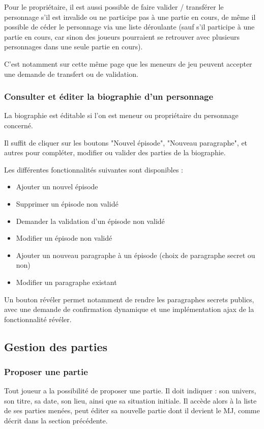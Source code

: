 \documentclass[a4paper, 11pt, titlepage]{article}
\begin{document}
Pour le propriétaire, il est aussi possible de faire valider / transférer le personnage s'il est invalide ou ne participe pas à une partie en cours, de même il possible de céder le personnage via une liste déroulante (sauf s'il participe à une partie en cours, car sinon des joueurs pourraient se retrouver avec plusieurs personnages dans une seule partie en cours).

C'est notamment sur cette même page que les meneurs de jeu peuvent accepter une demande de transfert ou de validation.


\subsubsection {Consulter et éditer la biographie d'un personnage}

La biographie est éditable si l'on est meneur ou propriétaire du personnage concerné.

Il suffit de cliquer sur les boutons "Nouvel épisode", "Nouveau paragraphe", et autres pour compléter, modifier ou valider des parties de la biographie.

Les différentes fonctionnalités suivantes sont disponibles :
\begin{itemize}
\item
Ajouter un nouvel épisode
\item
Supprimer un épisode non validé
\item
Demander la validation d'un épisode non validé
\item
Modifier un épisode non validé
\item
Ajouter un nouveau paragraphe à un épisode (choix de paragraphe secret ou non)
\item
Modifier un paragraphe existant
\end{itemize}

Un bouton révéler permet notamment de rendre les paragraphes secrets publics, avec une demande de confirmation dynamique et une implémentation {\sc ajax} de la fonctionnalité révéler.


\subsection {Gestion des parties}

\subsubsection {Proposer une partie}

Tout joueur a la possibilité de proposer une partie. Il doit indiquer : son univers, son titre, sa date, son lieu, ainsi que sa situation initiale. Il accède alors à la liste de ses parties menées, peut éditer sa nouvelle partie dont il devient le MJ, comme décrit dans la section précédente.
\end{document}
